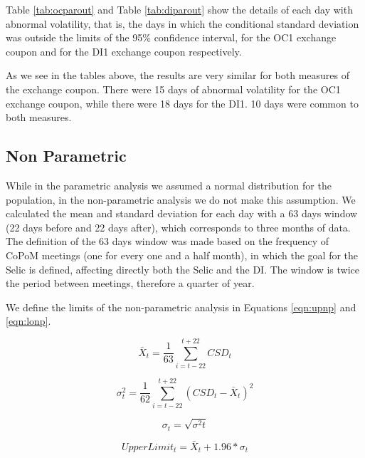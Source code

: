 \documentclass[cic,tc, english]{iiufrgs}
\begin{document}
    

    

    

    Table \ref{tab:ocparout} and Table \ref{tab:diparout} show the details of each day with abnormal volatility, that is, the days in which the conditional standard deviation was outside the limits of the 95\% confidence interval, for the OC1 exchange coupon and for the DI1 exchange coupon respectively.

    

    

    As we see in the tables above, the results are very similar for both measures of the exchange coupon. There were 15 days of abnormal volatility for the OC1 exchange coupon, while there were 18 days for the DI1. 10 days were common to both measures.

\subsection{Non Parametric}

    While in the parametric analysis we assumed a normal distribution for the population, in the non-parametric analysis we do not make this assumption. We calculated the mean and standard deviation for each day with a 63 days window (22 days before and 22 days after), which corresponds to three months of data. The definition of the 63 days window was made based on the frequency of CoPoM meetings (one for every one and a half month), in which the goal for the Selic is defined, affecting directly both the Selic and the DI. The window is twice the period between meetings, therefore a quarter of year.

    We define the limits of the non-parametric analysis in Equations \ref{eqn:upnp} and \ref{eqn:lonp}.

    $$\bar{X}_t = \frac{1}{63} \displaystyle\sum_{i=t-22}^{t+22} CSD_t$$

    $$\sigma^2_t = \frac{1}{62} \displaystyle\sum_{i=t-22}^{t+22} (CSD_t - \bar{X}_t)^2$$

    $$\sigma_t = \sqrt{\sigma^2t}$$

    \begin{equation}
        \label{eqn:upnp}
        UpperLimit_t = \bar{X}_t + 1.96 * \sigma_t
    \end{equation}
\end{document}
